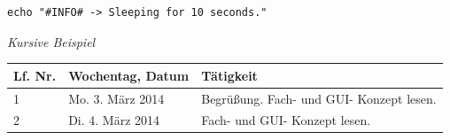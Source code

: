 \documentclass[a4paper, 12pt]{extarticle}
\begin{document}
  \begin{lstlisting}[style=bash]
echo "#INFO# -> Sleeping for 10 seconds."
  \end{lstlisting}
  
  \emph{Kursive Beispiel}

\pagebreak
{}



\newpage
{}

\begin{center}
  \begin{tabular}{|l|l|p{7cm}|}
    \hline
    Lf. Nr. & Wochentag, Datum & Tätigkeit\\
    \hline\hline
    1 & Mo. 3. März 2014 & Begrüßung. Fach- und GUI- Konzept lesen.\\
    \hline
    2 & Di. 4. März 2014 & Fach- und GUI- Konzept lesen.\\
    \hline
  \end{tabular}
\end{center}

{}
%

\end{document}
